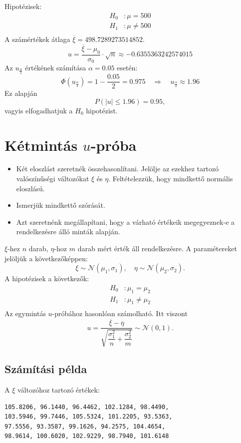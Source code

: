 \documentclass[a4paper]{article}
\begin{document}
\bigskip

Hipotézisek:
\begin{align*}
H_0 &: \mu = 500 \\
H_1 &: \mu \neq 500 \\
\end{align*}
A számértékek átlaga $\overline{\xi} = 498.7289273514852$.
\[
u = \dfrac{\overline{\xi} - \mu_0}{\sigma_0} \cdot \sqrt{n} \approx
-0.6355363242574015
\]
Az $u_{\frac{\alpha}{2}}$ értékének számítása $\alpha = 0.05$ esetén:
\[
\Phi(u_{\frac{\alpha}{2}}) = 1 - \dfrac{0.05}{2} = 0.975
\quad \Rightarrow \quad
u_{\frac{\alpha}{2}} \approx 1.96
\]
Ez alapján
\[
P(|u| \leq 1.96) = 0.95,
\]
vagyis elfogadhatjuk a $H_0$ hipotézist.

\section{Kétmintás $u$-próba}

\begin{itemize}
\item Két eloszlást szeretnék összehasonlítani. Jelölje az ezekhez tartozó valószínűségi változókat $\xi$ és $\eta$. Feltételezzük, hogy mindkettő normális eloszlású.
\item Ismerjük mindkettő szórását.
\item Azt szeretnénk megállapítani, hogy a várható értékeik megegyeznek-e a rendelkezésre álló minták alapján.
\end{itemize}
$\xi$-hez $n$ darab, $\eta$-hoz $m$ darab mért érték áll rendelkezésre.
A paramétereket jelöljük a következőképpen:
\[
\xi \sim \mathcal{N}(\mu_1, \sigma_1), \quad \eta \sim \mathcal{N}(\mu_2, \sigma_2).
\]
A hipotézisek a következők:
\begin{align*}
H_0 &: \mu_1 = \mu_2 \\
H_1 &: \mu_1 \neq \mu_2 \\
\end{align*}
Az egymintás $u$-próbához hasonlóan számolható. Itt viszont
\[
u = \dfrac{\overline{\xi} - \overline{\eta}}
{\sqrt{\dfrac{\sigma_1^2}{n} + \dfrac{\sigma_2^2}{m}}}
\sim
\mathcal{N}(0, 1).
\]

\subsection{Számítási példa}

A $\xi$ változóhoz tartozó értékek:
\begin{verbatim}
105.8206, 96.1440, 96.4462, 102.1284, 98.4490,
103.5946, 99.7446, 105.5324, 101.2205, 93.5363,
97.5556, 93.3587, 99.1626, 94.2575, 104.4654,
98.9614, 100.6020, 102.9229, 98.7940, 101.6148
\end{verbatim}
\end{document}
